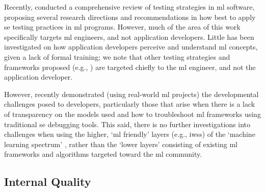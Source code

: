 Recently, \citet{braiek2018testing} conducted a comprehensive review of testing strategies in \gls{ml} software, proposing several research directions and recommendations in how best to apply \gls{se} testing practices in \gls{ml} programs. However, much of the area of this work specifically targets \gls{ml} engineers, and not application developers. Little has been investigated on how application developers perceive and understand \gls{ml} concepts, given a lack of formal training; we note that other testing strategies and frameworks proposed (e.g., \citep{nishi2018test,murphy2008improving,breck2016s}) are targeted chiefly to the \gls{ml} engineer, and not the application developer.

However, \citet{Arpteg:2018ke} recently demonstrated (using real-world \gls{ml} projects) the developmental challenges posed to developers, particularly those that arise when there is a lack of transparency on the models used and how to troubleshoot \gls{ml} frameworks using traditional \gls{se} debugging tools. This said, there is no further investigations into challenges when using the higher, `\gls{ml} friendly' layers (e.g., \glspl{iws}) of the `machine learning spectrum' \citep{Ortiz:2017wg}, rather than the `lower layers' consisting of existing \gls{ml} frameworks and algorithms targeted toward the \gls{ml} community.

\subsection{Internal Quality}


 
